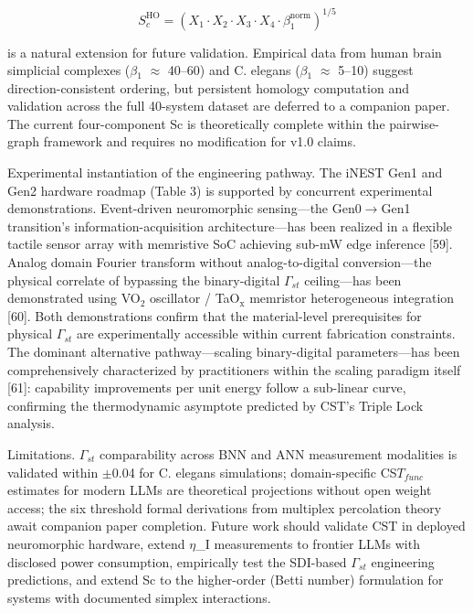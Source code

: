 \documentclass[a4paper,12pt]{article}
\providecommand{\textsubscript}[1]{\ensuremath{_{\text{#1}}}}
\begin{document}
\begin{equation}

S_c^{\text{HO}} = (X_1 \cdot X_2 \cdot X_3 \cdot X_4 \cdot \beta_1^{\text{norm}})^{1/5}

\end{equation}


is a natural extension for future validation. Empirical data from human brain simplicial complexes ($\beta$\textsubscript{1} $\approx$ 40--60) and C. elegans ($\beta$\textsubscript{1} $\approx$ 5--10) suggest direction-consistent ordering, but persistent homology computation and validation across the full 40-system dataset are deferred to a companion paper. The current four-component Sc is theoretically complete within the pairwise-graph framework and requires no modification for v1.0 claims.


Experimental instantiation of the engineering pathway.
The iNEST Gen1 and Gen2 hardware roadmap (Table 3) is supported by concurrent experimental demonstrations.
Event-driven neuromorphic sensing---the Gen0$\rightarrow$Gen1 transition's information-acquisition architecture---has been realized in a flexible tactile sensor array with memristive SoC achieving sub-mW edge inference [59].
Analog domain Fourier transform without analog-to-digital conversion---the physical correlate of bypassing the binary-digital $\Gamma_{st}$ ceiling---has been demonstrated using VO\textsubscript{2} oscillator / TaO\textsubscript{x} memristor heterogeneous integration [60].
Both demonstrations confirm that the material-level prerequisites for physical $\Gamma_{st}$ are experimentally accessible within current fabrication constraints.
The dominant alternative pathway---scaling binary-digital parameters---has been comprehensively characterized by practitioners within the scaling paradigm itself [61]: capability improvements per unit energy follow a sub-linear curve, confirming the thermodynamic asymptote predicted by CST's Triple Lock analysis.


Limitations. $\Gamma_{st}$ comparability across BNN and ANN measurement modalities is validated within $\pm$0.04 for C. elegans simulations; domain-specific CS$T_{func}$ estimates for modern LLMs are theoretical projections without open weight access; the six threshold formal derivations from multiplex percolation theory await companion paper completion.
Future work should validate CST in deployed neuromorphic hardware, extend $\eta$_I measurements to frontier LLMs with disclosed power consumption, empirically test the SDI-based $\Gamma_{st}$ engineering predictions, and extend Sc to the higher-order (Betti number) formulation for systems with documented simplex interactions.
\end{document}
